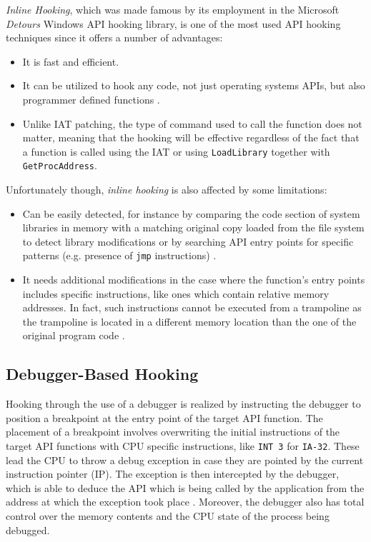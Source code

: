 \textit{Inline Hooking}, which was made famous by its employment  in the Microsoft \textit{Detours} Windows API hooking library, is one of the most used API hooking techniques since it offers a number of advantages:
\begin{itemize}
\item It is fast and efficient.
\item It can be utilized to hook any code, not just operating systems APIs, but also programmer defined functions \cite{Rootkit}. 
\item Unlike IAT patching, the type of command used to call the function does not matter, meaning that the hooking will be effective regardless of the fact that a function is called using the IAT or using \texttt{LoadLibrary} together with \texttt{GetProcAddress}.
\end{itemize} 

Unfortunately though, \textit{inline hooking} is also affected by some limitations:

\begin{itemize}
\item Can be easily detected, for instance by comparing the code section of system libraries in memory with a matching original copy loaded from the file system to detect library modifications \cite{Buescher:2011:BIS:2186328.2186347} or by searching API entry points for specific patterns (e.g. presence of \texttt{jmp} instructions) \cite{HookingDetection}.
\item It needs additional modifications in the case where the function's entry points includes specific instructions, like ones which contain relative memory addresses. In fact, such instructions cannot be executed from a trampoline as the trampoline is located in a different memory location than the one of the original program code \cite{Berdajs:2010:EAU:1815744.1815746}.
\end{itemize}

\subsection{Debugger-Based Hooking}

Hooking through the use of a debugger is realized by instructing the debugger to position a breakpoint at the entry point of the target API function. The placement of a breakpoint involves overwriting the initial instructions of the target API functions with CPU specific instructions, like \texttt{INT 3} for \texttt{IA-32}. These lead the CPU to throw a debug exception in case they are pointed by the current instruction pointer (IP). The exception is then intercepted by the debugger, which is able to deduce the API which is being called by the application from the address at which the exception took place \cite{HookingDetection}. Moreover, the debugger also has total control over the memory contents and the CPU state of the process being debugged.


